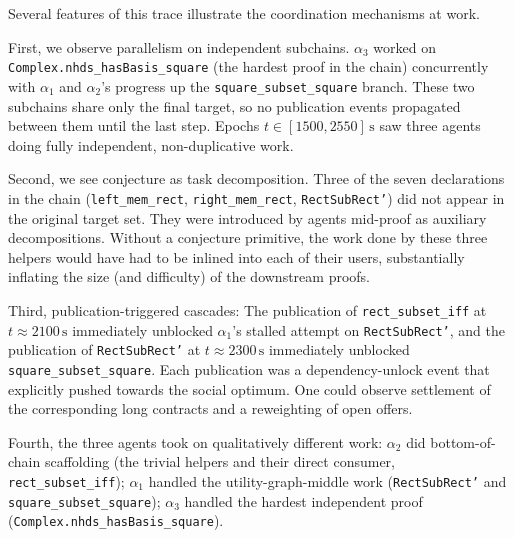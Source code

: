 Several features of this trace illustrate the coordination mechanisms at work.
 
First, we observe parallelism on independent subchains. $\alpha_3$ worked on \texttt{Complex.nhds\_hasBasis\_square} (the hardest proof in the chain) concurrently with $\alpha_1$ and $\alpha_2$'s progress up the \texttt{square\_subset\_square} branch. These two subchains share only the final target, so no publication events propagated between them until the last step. Epochs $t \in [1500, 2550]\,\mathrm{s}$ saw three agents doing fully independent, non-duplicative work.
 
Second, we see conjecture as task decomposition. Three of the seven declarations in the chain (\texttt{left\_mem\_rect}, \texttt{right\_mem\_rect}, \texttt{RectSubRect'}) did not appear in the original target set. They were introduced by agents mid-proof as auxiliary decompositions. Without a conjecture primitive, the work done by these three helpers would have had to be inlined into each of their users, substantially inflating the size (and difficulty) of the downstream proofs.
 
Third, publication-triggered cascades: The publication of \texttt{rect\_subset\_iff} at $t\!\approx\!2100\,\mathrm{s}$ immediately unblocked $\alpha_1$'s stalled attempt on \texttt{RectSubRect'}, and the publication of \texttt{RectSubRect'} at $t\!\approx\!2300\,\mathrm{s}$ immediately unblocked \texttt{square\_subset\_square}. Each publication was a dependency-unlock event that explicitly pushed towards the social optimum. One could observe settlement of the corresponding long contracts and a reweighting of open offers.


Fourth, the three agents took on qualitatively different work: $\alpha_2$ did bottom-of-chain scaffolding (the trivial helpers and their direct consumer, \texttt{rect\_subset\_iff}); $\alpha_1$ handled the utility-graph-middle work (\texttt{RectSubRect'} and \texttt{square\_subset\_square}); $\alpha_3$ handled the hardest independent proof (\texttt{Complex.nhds\_hasBasis\_square}).

